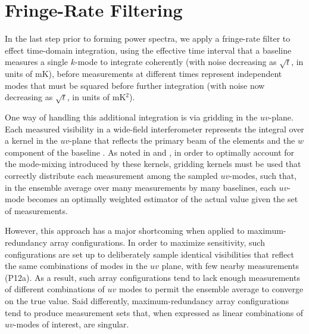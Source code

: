 \documentclass[twocolumn,numberedappendix]{emulateapj}
\begin{document}
\section{Fringe-Rate Filtering}
\label{sec:fringe_rate_filtering}

In the last step prior to forming power spectra,
we apply a fringe-rate filter to effect time-domain integration,
using the effective time interval that a baseline measures a single $k$-mode to integrate coherently
(with noise decreasing
as $\sqrt{t}$, in units of mK), before measurements at different times represent independent modes
that must be squared before further integration (with noise now decreasing as $\sqrt{t}$, in units of mK$^2$).

One way of handling this additional integration is via gridding in the $uv$-plane.
Each measured visibility in a wide-field interferometer represents the integral over a kernel in
the $uv$-plane that reflects the primary beam of the elements \citep{bhatnagar_et_al2008,morales_matejek2009} and the $w$ component 
of the baseline \citep{cornwell_et_al2003}.  As noted in
\citet{sullivan_et_al2012} and \citet{morales_matejek2009},
in order to optimally account for the mode-mixing introduced by these kernels, gridding kernels must be
used that correctly distribute each measurement among the sampled $uv$-modes, such that, in the ensemble average
over many measurements by many baselines, each $uv$-mode becomes an optimally weighted estimator of the actual
value given the set of measurements.

However, this approach has a major shortcoming when applied to maximum-redundancy array configurations.
In order
to maximize sensitivity, such
configurations are set up to deliberately sample identical visibilities that reflect the same 
combinations of modes in the $uv$ plane, with few nearby measurements (P12a).  As a result,
such array configurations tend to lack enough measurements of different combinations of $uv$ modes
to permit the ensemble average to converge on the true value.  Said differently, maximum-redundancy
array configurations tend to produce measurement sets that, when expressed as linear combinations
of $uv$-modes of interest, are singular.
\end{document}
